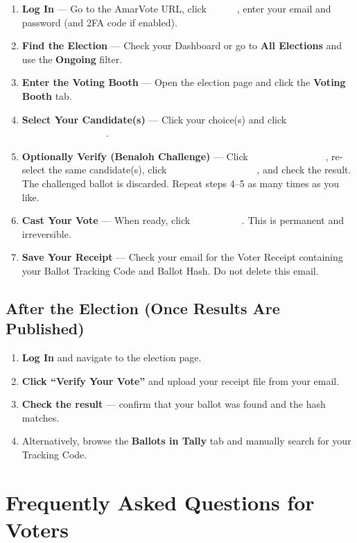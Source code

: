 \documentclass[12pt,a4paper,openany]{book}
\newcommand{\uibutton}[1]{\colorbox{primaryblue}{\textcolor{white}{\small\textbf{#1}}}}
\newcommand{\uimenu}[1]{\textbf{\color{primaryblue}#1}}
\begin{document}
\begin{enumerate}
	\item \textbf{Log In} --- Go to the AmarVote URL, click \uibutton{Login}, enter your email and password (and 2FA code if enabled).
	\item \textbf{Find the Election} --- Check your Dashboard or go to \uimenu{All Elections} and use the \uimenu{Ongoing} filter.
	\item \textbf{Enter the Voting Booth} --- Open the election page and click the \uimenu{Voting Booth} tab.
	\item \textbf{Select Your Candidate(s)} --- Click your choice(s) and click \uibutton{Create Encrypted Ballot}.
	\item \textbf{Optionally Verify (Benaloh Challenge)} --- Click \uibutton{Challenge Vote}, re-select the same candidate(s), click \uibutton{Submit Challenge}, and check the result. The challenged ballot is discarded. Repeat steps 4--5 as many times as you like.
	\item \textbf{Cast Your Vote} --- When ready, click \uibutton{Cast Vote}. This is permanent and irreversible.
	\item \textbf{Save Your Receipt} --- Check your email for the Voter Receipt containing your Ballot Tracking Code and Ballot Hash. Do not delete this email.
\end{enumerate}

\section{After the Election (Once Results Are Published)}

\begin{enumerate}
	\item \textbf{Log In} and navigate to the election page.
	\item \textbf{Click ``Verify Your Vote''} and upload your receipt file from your email.
	\item \textbf{Check the result} --- confirm that your ballot was found and the hash matches.
	\item Alternatively, browse the \uimenu{Ballots in Tally} tab and manually search for your Tracking Code.
\end{enumerate}

\appendix

\chapter{Frequently Asked Questions for Voters}
\end{document}
